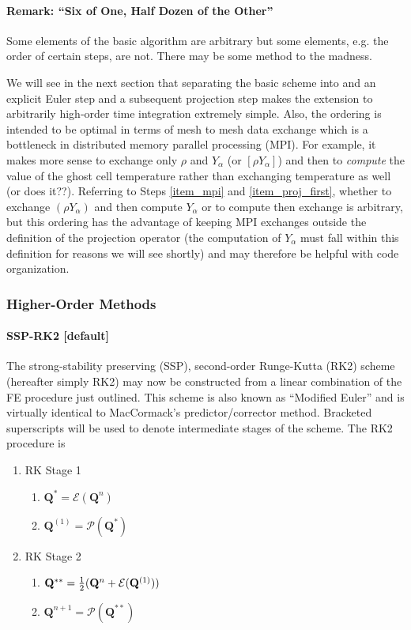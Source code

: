 \documentclass[11pt]{article}
\begin{document}
\paragraph{Remark: ``Six of One, Half Dozen of the Other''} Some elements of the basic algorithm are arbitrary but some elements, e.g. the order of certain steps, are not.  There may be some method to the madness.

We will see in the next section that separating the basic scheme into and an explicit Euler step and a subsequent projection step makes the extension to arbitrarily high-order time integration extremely simple.  Also, the ordering is intended to be optimal in terms of mesh to mesh data exchange which is a bottleneck in distributed memory parallel processing (MPI).  For example, it makes more sense to exchange only $\rho$ and $Y_\alpha$ (or $[\rho Y_\alpha]$) and then to \emph{compute} the value of the ghost cell temperature rather than exchanging temperature as well (or does it??).  Referring to Steps \ref{item_mpi} and \ref{item_proj_first}, whether to exchange $(\rho Y_\alpha)$ and then compute $Y_\alpha$ or to compute then exchange is arbitrary, but this ordering has the advantage of keeping MPI exchanges outside the definition of the projection operator (the computation of $Y_\alpha$ must fall within this definition for reasons we will see shortly) and may therefore be helpful with code organization.


\subsubsection{Higher-Order Methods}

\paragraph{SSP-RK2 [default]}

The strong-stability preserving (SSP), second-order Runge-Kutta (RK2) scheme (hereafter simply RK2) may now be constructed from a linear combination of the FE procedure just outlined.  This scheme is also known as ``Modified Euler'' and is virtually identical to MacCormack's predictor/corrector method.  Bracketed superscripts will be used to denote intermediate stages of the scheme.  The RK2 procedure is

\begin{enumerate}
\item RK Stage 1
    \begin{enumerate}
    \item $\mathbf{Q}^{*} = \mathcal{E}(\mathbf{Q}^n)$
    \item $\mathbf{Q}^{(1)} = \mathcal{P}(\mathbf{Q}^*)$
    \end{enumerate}
\item RK Stage 2
    \begin{enumerate}
    \item $\mathbf{Q}^{**} = \mbox{$\frac{1}{2}$} (\mathbf{Q}^n + \mathcal{E}(\mathbf{Q}^{(1)}))$
    \item $\mathbf{Q}^{n+1} = \mathcal{P}(\mathbf{Q}^{**})$
    \end{enumerate}
\end{enumerate}
\end{document}
